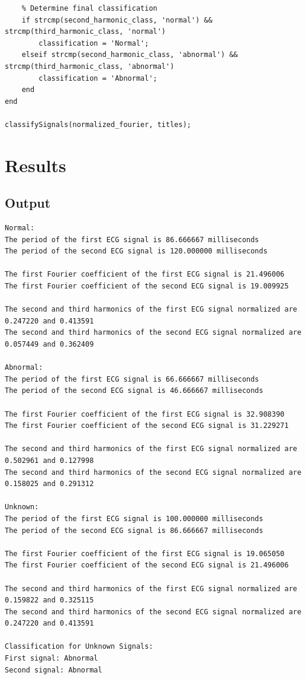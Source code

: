 \documentclass{zc-ust-hw}
\begin{document}
\begin{verbatim}
    % Determine final classification
    if strcmp(second_harmonic_class, 'normal') && strcmp(third_harmonic_class, 'normal')
        classification = 'Normal';
    elseif strcmp(second_harmonic_class, 'abnormal') && strcmp(third_harmonic_class, 'abnormal')
        classification = 'Abnormal';
    end
end

classifySignals(normalized_fourier, titles);
\end{verbatim}

\section{Results}

\subsection{Output}

\begin{verbatim}
Normal:
The period of the first ECG signal is 86.666667 milliseconds
The period of the second ECG signal is 120.000000 milliseconds

The first Fourier coefficient of the first ECG signal is 21.496006
The first Fourier coefficient of the second ECG signal is 19.009925

The second and third harmonics of the first ECG signal normalized are 0.247220 and 0.413591
The second and third harmonics of the second ECG signal normalized are 0.057449 and 0.362409

Abnormal:
The period of the first ECG signal is 66.666667 milliseconds
The period of the second ECG signal is 46.666667 milliseconds

The first Fourier coefficient of the first ECG signal is 32.908390
The first Fourier coefficient of the second ECG signal is 31.229271

The second and third harmonics of the first ECG signal normalized are 0.502961 and 0.127998
The second and third harmonics of the second ECG signal normalized are 0.158025 and 0.291312

Unknown:
The period of the first ECG signal is 100.000000 milliseconds
The period of the second ECG signal is 86.666667 milliseconds

The first Fourier coefficient of the first ECG signal is 19.065050
The first Fourier coefficient of the second ECG signal is 21.496006

The second and third harmonics of the first ECG signal normalized are 0.159822 and 0.325115
The second and third harmonics of the second ECG signal normalized are 0.247220 and 0.413591

Classification for Unknown Signals:
First signal: Abnormal
Second signal: Abnormal
\end{verbatim}
\end{document}
